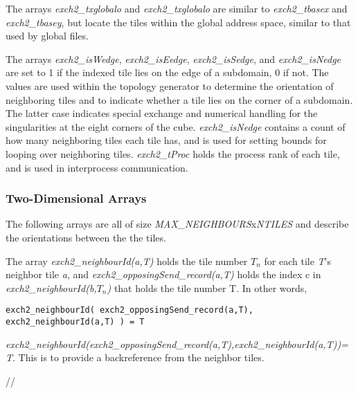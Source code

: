 The arrays {\em exch2\_txglobalo} and {\em exch2\_txglobalo} are similar to
{\em exch2\_tbasex} and {\em exch2\_tbasey}, but locate the tiles within
the global address space, similar to that used by global files.  

The arrays {\em exch2\_isWedge}, {\em exch2\_isEedge}, {\em exch2\_isSedge}, 
and {\em exch2\_isNedge} are set to 1 if the indexed tile lies on the edge
of a subdomain, 0 if not.  The values are used within the topology generator
to determine the orientation of neighboring tiles and to indicate whether 
a tile lies on the corner of a subdomain.  The latter case indicates 
special exchange and numerical handling for the singularities at the eight 
corners of the cube.  {\em exch2\_isNedge} contains a count of how many
neighboring tiles each tile has, and is used for setting bounds for looping
over neighboring tiles.  {\em exch2\_tProc} holds the process rank of each tile,
and is used in interprocess communication.

\subsubsection{Two-Dimensional Arrays}

The following arrays are all of size {\em MAX\_NEIGHBOURS}x{\em NTILES} and
describe the orientations between the the tiles.

The array {\em exch2\_neighbourId(a,T)} holds the tile number $T_{n}$ for each tile 
{\em T}'s neighbor tile {\em a}, and {\em exch2\_opposingSend\_record(a,T)} holds 
the index c in {\em exch2\_neighbourId(b,$T_{n}$)} that holds the tile number T.
In other words,

\begin{verbatim}   
exch2_neighbourId( exch2_opposingSend_record(a,T), exch2_neighbourId(a,T) ) = T
\end{verbatim}

{\em exch2\_neighbourId(exch2\_opposingSend\_record(a,T),exch2\_neighbourId(a,T))=T}.
This is to provide a backreference from the neighbor tiles.


//


